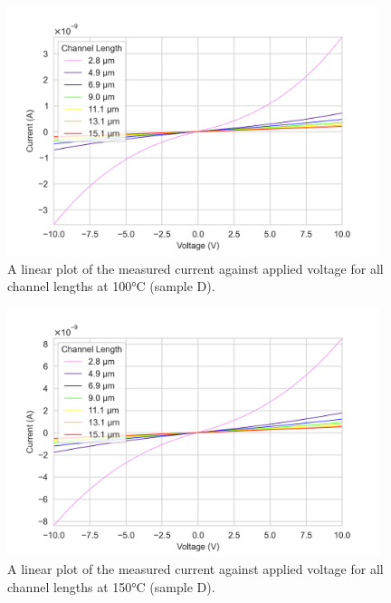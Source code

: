 \begin{figure}[h]
    \centering
    \includegraphics[width=0.97\textwidth]{Chapter6/Figs/Raster/Sample D 2019/IV/10V IV characteristics at 100 C.png}
    \caption{A linear plot of the measured current against applied voltage for all channel lengths at 100\si{\degreeCelsius} (sample D).}
    \label{appfig:D_current_voltage_100_10V}
\end{figure}
\begin{figure}[h]
    \centering
    \includegraphics[width=0.97\textwidth]{Chapter6/Figs/Raster/Sample D 2019/IV/10V IV characteristics at 150 C.png}
    \caption{A linear plot of the measured current against applied voltage for all channel lengths at 150\si{\degreeCelsius} (sample D).}
    \label{appfig:D_current_voltage_150_10V}
\end{figure}

